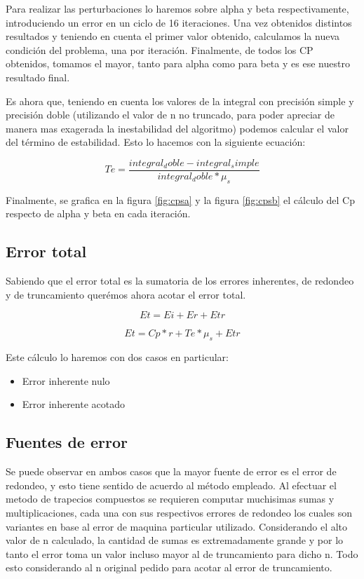 \documentclass[11pt,a4paper]{article}
\begin{document}
Para realizar las perturbaciones lo haremos sobre alpha y beta respectivamente, introduciendo un error en un ciclo de 16 iteraciones. Una vez obtenidos distintos resultados y teniendo en cuenta el primer valor obtenido, calculamos la nueva condición del problema, una por iteración. Finalmente, de todos los CP obtenidos, tomamos el mayor, tanto para alpha como para beta y es ese nuestro resultado final.

Es ahora que, teniendo en cuenta los valores de la integral con precisión simple y precisión doble (utilizando el valor de n no truncado, para poder apreciar de manera mas exagerada la inestabilidad del algoritmo) podemos calcular el valor del término de estabilidad. Esto lo hacemos con la siguiente ecuación:

\[ Te = \frac{integral_doble - integral_simple}{integral_doble*\mu_s} \]

Finalmente, se grafica en la figura \ref{fig:cpsa} y la figura \ref{fig:cpsb} el cálculo del Cp respecto de alpha y beta en cada iteración.


\subsection{Error total}

Sabiendo que el error total es la sumatoria de los errores inherentes, de redondeo y de truncamiento querémos ahora acotar el error total.

\[ Et = Ei + Er + Etr \]

\[ Et = Cp * r + Te * \mu_s + Etr \]

Este cálculo lo haremos con dos casos en particular:

\begin{itemize}
\item Error inherente nulo
\item Error inherente acotado
\end{itemize}

\subsection{Fuentes de error}

Se puede observar en ambos casos que la mayor fuente de error es el error de redondeo, y esto tiene sentido de acuerdo al método empleado. Al efectuar el metodo de trapecios compuestos se requieren computar muchisimas sumas y multiplicaciones, cada una con sus respectivos errores de redondeo los cuales son variantes en base al error de maquina particular utilizado. Considerando el alto valor de n calculado, la cantidad de sumas es extremadamente grande y por lo tanto el error toma un valor incluso mayor al de truncamiento para dicho n. Todo esto considerando al n original pedido para acotar al error de truncamiento.
\end{document}
